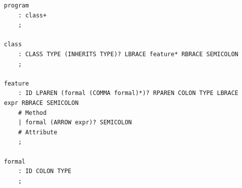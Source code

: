 \documentclass[titlepage]{article}
\begin{document}
\begin{lstlisting}[basicstyle=\ttfamily]
    program                                                                                                    
    : class+                                                                                               
    ;                                                                                                      
                                                                                                           
class                                                                                                      
    : CLASS TYPE (INHERITS TYPE)? LBRACE feature* RBRACE SEMICOLON                                         
    ;                                                                                                      
                                                                                                           
feature                                                                                                    
    : ID LPAREN (formal (COMMA formal)*)? RPAREN COLON TYPE LBRACE expr RBRACE SEMICOLON
    # Method         
    | formal (ARROW expr)? SEMICOLON
    # Attribute      
    ;                                                                                                      
                                                                                                           
formal                                                                                                     
    : ID COLON TYPE                                                                                        
    ;                                                                                                      
                                                                                                           

\end{lstlisting}
\end{document}
